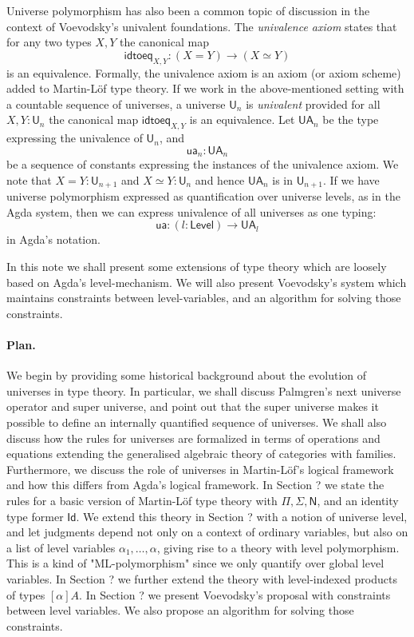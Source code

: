 \documentclass[11pt,a4paper]{article}
\newcommand{\Id}{\mathsf{Id}}
\def\NN{\mathsf{N}}
\def\UU{\mathsf{U}}
\def\Level{\mathsf{Level}}
\newcommand{\U}{\mathsf{U}}
\newcommand{\idtoeq}{\mathsf{idtoeq}}
\newcommand{\ua}{\mathsf{ua}}
\newcommand{\UA}{\mathsf{UA}}
\begin{document}

Universe polymorphism has also been a common topic of discussion in the context of Voevodsky's univalent foundations. The {\em univalence axiom} states that for any two types $X,Y$ the canonical map 
$$
\idtoeq_{X,Y} : (X=Y)\to (X\simeq Y)
$$
is an equivalence. Formally, the univalence axiom is an axiom (or axiom scheme) added to Martin-Löf type theory. If we work in the above-mentioned setting with a countable sequence of universes, a universe $\U_n$ is {\em univalent} provided for all $X,Y : \UU_n$ the canonical map $\idtoeq_{X,Y}$ is an equivalence. Let $\UA_n$ be the type expressing the univalence of $\UU_n$, and 
$$
\ua_n : \UA_n
$$ 
be a sequence of constants expressing the instances of the univalence axiom. We note that $X = Y : \UU_{n+1}$ and $X\simeq Y : \UU_n$ and hence $\UA_n$ is in $\UU_{n+1}$. If we have universe polymorphism expressed as quantification over universe levels, as in the Agda system, then we can express univalence of all universes as one typing:
$$
\ua : (l : \Level) \to \UA_l
$$
in Agda's notation.

In this note we shall present some extensions of type theory which are loosely based on Agda's level-mechanism. We will also present Voevodsky's system which maintains constraints between level-variables, and an algorithm for solving those constraints.

\paragraph{Plan.} We begin by providing some historical background about the evolution of universes in type theory. In particular, we shall discuss Palmgren's next universe operator and super universe, and point out that the super universe makes it possible to define an internally quantified sequence of universes. We shall also discuss how the rules for universes are formalized in terms of operations and equations extending the generalised algebraic theory of categories with families. Furthermore, we discuss the role of universes in Martin-Löf's logical framework and how this differs from Agda's logical framework. In Section ? we state the rules for a basic version of Martin-Löf type theory with $\Pi, \Sigma, \NN$, and an identity type former $\Id$. We extend this theory in Section ? with a notion of universe level, and let judgments depend not only on a context of ordinary variables, but also on a list of level variables $\alpha_1, \ldots, \alpha$, giving rise to a theory with level polymorphism. This is a kind of "ML-polymorphism" since we only quantify over global level variables. In Section ? we further extend the theory with level-indexed products of types $[\alpha]A$. In Section ? we present Voevodsky's proposal with constraints between level variables. We also propose an algorithm for solving those constraints.
\end{document}
